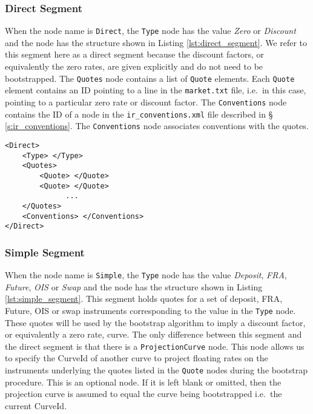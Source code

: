 \subsubsection*{Direct Segment}
When the node name is \lstinline!Direct!, the \lstinline!Type! node has the value \emph{Zero} or \emph{Discount} and the 
node has the structure shown in Listing \ref{lst:direct_segment}. We refer to this segment here as a direct segment 
because the discount factors, or equivalently the zero rates, are given explicitly and do not need to be bootstrapped. The 
\lstinline!Quotes! node contains a list of \lstinline!Quote! elements. Each \lstinline!Quote! element contains an ID 
pointing to a line in the {\tt market.txt} file, i.e.\ in this case, pointing to a particular zero rate or discount 
factor. The \lstinline!Conventions! node contains the ID of a node in the {\tt ir\_conventions.xml} file described in \S 
\ref{s:ir_conventions}. The \lstinline!Conventions! node associates conventions with the quotes.

\begin{lstlisting}[caption=Direct yield curve segment, label=lst:direct_segment]
<Direct>
	<Type> </Type>
	<Quotes>
		<Quote> </Quote>
		<Quote> </Quote>
		      ...
	</Quotes>
	<Conventions> </Conventions>
</Direct>
\end{lstlisting}

\subsubsection*{Simple Segment}
When the node name is \lstinline!Simple!, the \lstinline!Type! node has the value \emph{Deposit}, \emph{FRA}, 
\emph{Future}, \emph{OIS} or \emph{Swap} and the node has the structure shown in Listing \ref{lst:simple_segment}. This 
segment holds quotes for a set of deposit, FRA, Future, OIS or swap instruments corresponding to the value in the 
\lstinline!Type! node. These quotes will be used by the bootstrap algorithm to imply a discount factor, or equivalently a 
zero rate, curve. The only difference between this segment and the direct segment is that there is a 
\lstinline!ProjectionCurve! node. This node allows us to specify the CurveId of another curve to project floating rates on 
the instruments underlying the quotes listed in the \lstinline!Quote! nodes during the bootstrap procedure. This is an 
optional node. If it is left blank or omitted, then the projection curve is assumed to equal the curve being bootstrapped 
i.e.\ the current CurveId.

